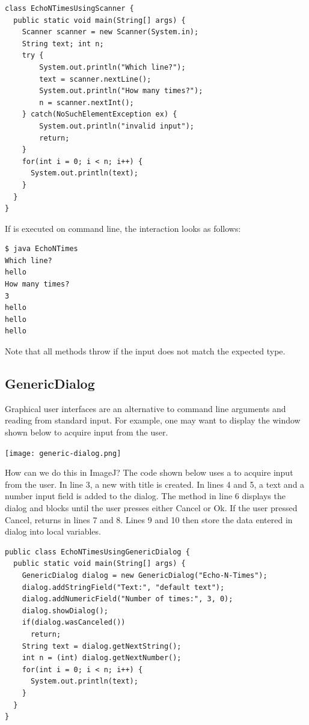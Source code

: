\documentclass{book}
\begin{document}
\begin{lstlisting}
class EchoNTimesUsingScanner {
  public static void main(String[] args) {
    Scanner scanner = new Scanner(System.in);
    String text; int n;
    try {
    	System.out.println("Which line?");
    	text = scanner.nextLine();
    	System.out.println("How many times?");
    	n = scanner.nextInt();
    } catch(NoSuchElementException ex) {
    	System.out.println("invalid input");
    	return;
    }
    for(int i = 0; i < n; i++) {
      System.out.println(text);    
    }
  }
}
\end{lstlisting}

If  is executed on command line, the interaction looks as follows:

\begin{verbatim} 
$ java EchoNTimes
Which line?
hello
How many times?
3
hello
hello
hello
\end{verbatim}

Note that all  methods throw  if the input does not match the expected type.

\subsection{GenericDialog}
Graphical user interfaces are an alternative to command line arguments and reading from standard input. For example, one may want to display the window shown below to acquire input from the user.  

\begin{center}
\texttt{[image: generic-dialog.png]}
\end{center}

How can we do this in ImageJ? The code shown below uses a  to acquire input from the user. In line 3, a new  with title  is created. In lines 4 and 5, a text  and a number input field is added to the dialog. The method  in line 6 displays the dialog and blocks until the user presses either Cancel or Ok.  If the user pressed Cancel,  returns in lines 7 and 8. Lines 9 and 10 then store the data entered in dialog into local variables. 

\begin{lstlisting}
public class EchoNTimesUsingGenericDialog {
  public static void main(String[] args) {
    GenericDialog dialog = new GenericDialog("Echo-N-Times");
    dialog.addStringField("Text:", "default text");
    dialog.addNumericField("Number of times:", 3, 0);
    dialog.showDialog();
    if(dialog.wasCanceled())
      return;
    String text = dialog.getNextString();
    int n = (int) dialog.getNextNumber();
    for(int i = 0; i < n; i++) {
      System.out.println(text);    
    }
  }
}
\end{lstlisting}
\end{document}
